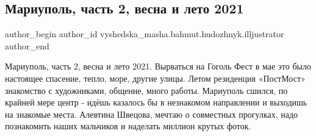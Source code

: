  
 
 
 
 

\subsection{Мариуполь, часть 2, весна и лето 2021}
\label{sec:07_12_2021.fb.vyshedska_masha.bahmut.hudozhnyk.illjustrator.1.mariupol__chast_2__v}

\ifcmt
 author_begin
   author_id vyshedska_masha.bahmut.hudozhnyk.illjustrator
 author_end
\fi

Мариуполь, часть 2, весна и лето 2021. Вырваться на Гоголь Фест в мае это было
настоящее спасение, тепло, море, другие улицы. Летом резиденция «ПостМост»
знакомство с художниками, общение, много работы. Мариуполь сшился, по крайней
мере центр - идёшь казалось бы в незнакомом направлении и выходишь на знакомые
места. Алевтина Швецова, мечтаю о совместных прогулках, надо познакомить наших
мальчиков и наделать миллион крутых фоток.
